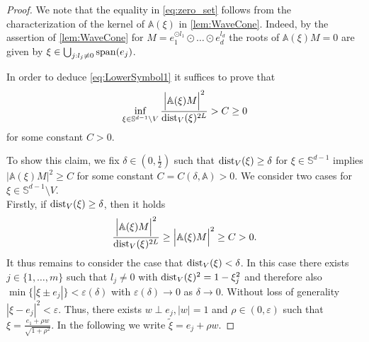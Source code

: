 \documentclass[a4paper, 10pt, twoside, notitlepage]{amsart}
\theoremstyle{plain}
\renewcommand{\AA}{\mathbb{A}}
\begin{document}
		\begin{proof}

We note that the equality in \eqref{eq:zero_set} follows from the characterization of the kernel of $\AA(\xi)$ in \cref{lem:WaveCone}. Indeed, by the assertion of \cref{lem:WaveCone} for $M = e_1^{\odot l_1} \odot \dots \odot e_d^{l_d}$ the roots of $\AA(\xi)M=0$ are given by $\xi \in \bigcup_{j: l_j \neq 0}\operatorname{span}(e_j)$.  
		
		
In order to deduce \eqref{eq:LowerSymbol1} it suffices to prove that
				\begin{align*}
					\inf_{\xi \in \mathbb{S}^{d-1} \setminus V} \frac{\Big| \AA(\xi) M \Big|^2}{\dist_V(\xi)^{2L}} > C \geq 0
				\end{align*}
				for some constant $C > 0$.  
				
				To show this claim, we fix $\delta \in (0,\frac{1}{2})$
				such that $\operatorname{dist}_V(\xi) \geq \delta$ for
				$\xi \in \mathbb{S}^{d-1}$ implies $|\AA(\xi)M|^2 \geq C$ for some constant $C = C(\delta, \AA) > 0$.  We consider two cases for $\xi \in \mathbb{S}^{d-1} \setminus V$.\\
				Firstly, if $\operatorname{dist}_V(\xi) \geq \delta$, then it holds
					\begin{align*}
						\frac{\Big| \AA(\xi) M \Big|^2}{\dist_V(\xi)^{2L}} \geq \Big| \AA(\xi)M \Big|^2 \geq C > 0.
					\end{align*}
					It thus remains to consider the case that $\operatorname{dist}_V(\xi) < \delta$. In this case there exists $j \in \{1,\dots,m\}$ such that $l_j \neq 0$ with $\operatorname{dist}_V(\xi)^2 = 1 - \xi_j^2$ and therefore also $\min\{|\xi \pm e_j|\} < \varepsilon(\delta)$ with $\varepsilon(\delta) \rightarrow 0$ as $\delta \rightarrow 0$.  Without loss of generality $|\xi - e_j|^2 < \varepsilon$.  Thus,
					there exists $w \perp e_j, |w|=1$ and $\rho \in (0,\varepsilon)$ such that $\xi = \frac{e_1 + \rho w}{\sqrt{1+\rho^2}}$.  In the following we
					write $\tilde{\xi} = e_j + \rho w$.
					

\end{proof}
\end{document}
